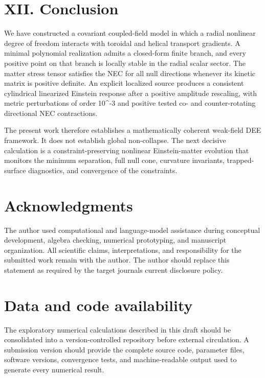 \section{XII. Conclusion}\label{xii.-conclusion}

We have constructed a covariant coupled-field model in which a radial
nonlinear degree of freedom interacts with toroidal and helical
transport gradients. A minimal polynomial realization admits a
closed-form finite branch, and every positive point on that branch is
locally stable in the radial scalar sector. The matter stress tensor
satisfies the NEC for all null directions whenever its kinetic matrix is
positive definite. An explicit localized source produces a consistent
cylindrical linearized Einstein response after a positive amplitude
rescaling, with metric perturbations of order 10\^{}-3 and positive
tested co- and counter-rotating directional NEC contractions.

The present work therefore establishes a mathematically coherent
weak-field DEE framework. It does not establish global non-collapse. The
next decisive calculation is a constraint-preserving nonlinear
Einstein-matter evolution that monitors the minimum separation, full
null cone, curvature invariants, trapped-surface diagnostics, and
convergence of the constraints.

\section{Acknowledgments}\label{acknowledgments}

The author used computational and language-model assistance during
conceptual development, algebra checking, numerical prototyping, and
manuscript organization. All scientific claims, interpretations, and
responsibility for the submitted work remain with the author. The author
should replace this statement as required by the target
journal\textquotesingle s current disclosure policy.

\section{Data and code availability}\label{data-and-code-availability}

The exploratory numerical calculations described in this draft should be
consolidated into a version-controlled repository before external
circulation. A submission version should provide the complete source
code, parameter files, software versions, convergence tests, and
machine-readable output used to generate every numerical result.

